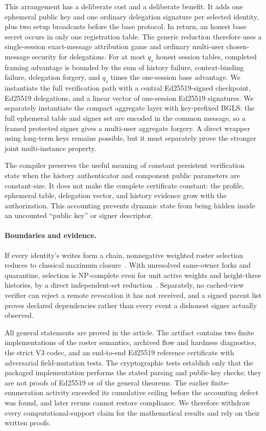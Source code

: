 \documentclass[11pt]{article}
\theoremstyle{definition}
\begin{document}
This arrangement has a deliberate cost and a deliberate benefit.  It adds one ephemeral public key and one ordinary delegation signature per selected identity, plus two setup broadcasts before the base protocol.  In return, an honest base secret occurs in only one registration table.  The generic reduction therefore uses a single-session exact-message attribution game and ordinary multi-user chosen-message security for delegations.  For at most $q_s$ honest session tables, completed framing advantage is bounded by the sum of history failure, context-binding failure, delegation forgery, and $q_s$ times the one-session base advantage.  We instantiate the full verification path with a central Ed25519-signed checkpoint, Ed25519 delegations, and a linear vector of one-session Ed25519 signatures.  We separately instantiate the compact aggregate layer with key-prefixed BGLS: the full ephemeral table and signer set are encoded in the common message, so a framed protected signer gives a multi-user aggregate forgery.  A direct wrapper using long-term keys remains possible, but it must separately prove the stronger joint multi-instance property.

The compiler preserves the useful meaning of constant persistent verification state when the history authenticator and component public parameters are constant-size.  It does not make the complete certificate constant: the profile, ephemeral table, delegation vector, and history evidence grow with the authorization.  This accounting prevents dynamic state from being hidden inside an uncounted ``public key'' or signer descriptor.

\paragraph{Boundaries and evidence.}
If every identity's writes form a chain, nonnegative weighted roster selection reduces to classical maximum closure~\cite{picard1976closure}.  With unresolved same-owner forks and quarantine, selection is NP-complete even for unit active weights and height-three histories, by a direct independent-set reduction~\cite{karp1972reducibility}.  Separately, no cached-view verifier can reject a remote revocation it has not received, and a signed parent list proves declared dependencies rather than every event a dishonest signer actually observed.

All general statements are proved in the article.  The artifact contains two finite implementations of the roster semantics, archived flow and hardness diagnostics, the strict V3 codec, and an end-to-end Ed25519 reference certificate with adversarial field-mutation tests.  The cryptographic tests establish only that the packaged implementation performs the stated parsing and public-key checks; they are not proofs of Ed25519 or of the general theorems.  The earlier finite-enumeration activity exceeded its cumulative ceiling before the accounting defect was found, and later reruns cannot restore compliance.  We therefore withdraw every computational-support claim for the mathematical results and rely on their written proofs.
\end{document}
